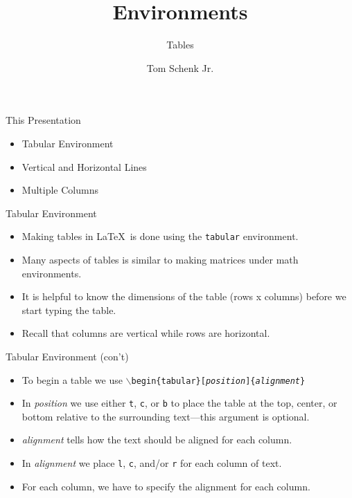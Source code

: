 \documentclass[pdf]{prosper}
\title{Environments}
\subtitle{Tables}
\author{Tom Schenk Jr.}
\begin{document}
\maketitle
\begin{slide}{This Presentation}
	\begin{itemize}
		\item Tabular Environment
		\item Vertical and Horizontal Lines
		\item Multiple Columns
	\end{itemize}
\end{slide}
\begin{slide}{Tabular Environment}
	\begin{itemize}
		\item Making tables in \LaTeX\ is done using the \texttt{tabular} environment.
		\item Many aspects of tables is similar to making matrices under math environments.
		\item It is helpful to know the dimensions of the table (rows x columns) before we start typing the table.
		\item Recall that columns are vertical while rows are horizontal.
	\end{itemize}
\end{slide}
\begin{slide}{Tabular Environment (con't)}
	\begin{itemize}
		\item To begin a table we use \texttt{$\backslash$begin\{tabular\}[\textit{position}]\{\textit{alignment}\}}
		\item In \textit{position} we use either \texttt{t}, \texttt{c}, or \texttt{b} to place the table at the top, center, or bottom relative to the surrounding text---this argument is optional.
		\item \textit{alignment} tells how the text should be aligned for each column.
		\item In \textit{alignment} we place \texttt{l}, \texttt{c}, and/or \texttt{r} for each column of text.
		\item For each column, we have to specify the alignment for each column.
	\end{itemize}
\end{slide}
\end{document}
